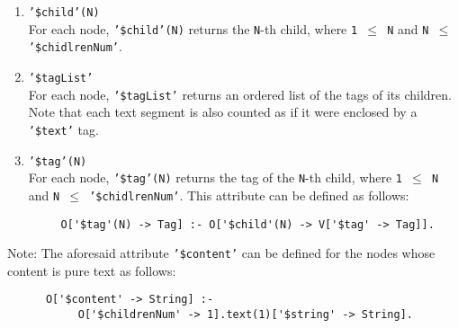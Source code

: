 \begin{enumerate}
\item {\tt '\$child'(N)} \\
For each node, {\tt '\$child'(N)} returns the {\tt N}-th child, where {\tt 1
  $\leq$ N} and {\tt N $\leq$ '\$chidlrenNum'}.

\item {\tt '\$tagList'} \\
For each node, {\tt '\$tagList'}  returns an ordered list of the
tags of its children. Note that each text segment is also counted
as if it were enclosed by a {\tt '\$text'}  tag.

\item {\tt '\$tag'(N)} \\
For each node, {\tt '\$tag'(N)}  returns the tag of the {\tt N}-th child, where {\tt 1
  $\leq$ N} and {\tt N $\leq$ '\$chidlrenNum'}.
This attribute can be defined as follows:

  \begin{verbatim}
     O['$tag'(N) -> Tag] :- O['$child'(N) -> V['$tag' -> Tag]]. 
  \end{verbatim}
\end{enumerate}

Note:
  The aforesaid attribute {\tt '\$content'}  can be defined
  for the nodes whose content is pure text as follows:

    \begin{verbatim}
      O['$content' -> String] :- 
	       O['$childrenNum' -> 1].text(1)['$string' -> String].
    \end{verbatim}

